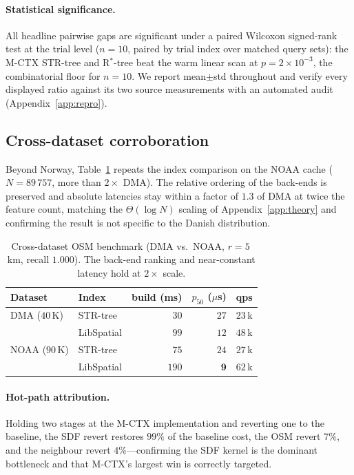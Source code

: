 \paragraph*{Statistical significance.}
All headline pairwise gaps are significant under a paired Wilcoxon
signed-rank test at the trial level ($n{=}10$, paired by trial index over
matched query sets): the M-CTX STR-tree and R$^{*}$-tree beat the warm
linear scan at $p\!=\!2\!\times\!10^{-3}$, the combinatorial floor for
$n{=}10$. We report mean$\pm$std throughout and verify every displayed
ratio against its two source measurements with an automated audit
(Appendix~\ref{app:repro}).


\subsection{Cross-dataset corroboration}\label{ssec:noaa}
Beyond Norway, Table~\ref{tab:cross-dataset} repeats the index comparison
on the NOAA cache ($N{=}89\,757$, more than $2\times$ DMA). The relative
ordering of the back-ends is preserved and absolute latencies stay within
a factor of $1.3$ of DMA at twice the feature count, matching the
$\Theta(\log N)$ scaling of Appendix~\ref{app:theory} and confirming the
result is not specific to the Danish distribution.

\begin{table}[t]
\centering
\caption{Cross-dataset OSM benchmark (DMA vs.\ NOAA, $r{=}5$\,km,
recall $1.000$). The back-end ranking and near-constant latency hold at
$2\times$ scale.}\label{tab:cross-dataset}
\small
\begin{tabular}{llrrr}
\toprule
Dataset & Index & build (ms) & $p_{50}$ ($\mu$s) & qps \\
\midrule
DMA  ($40$\,K) & STR-tree    & $30$ & $27$ & $23$\,k \\
               & LibSpatial  & $99$ & $12$ & $48$\,k \\
\midrule
NOAA ($90$\,K) & STR-tree    & $75$ & $24$ & $27$\,k \\
               & LibSpatial  & $190$ & $\mathbf{9}$ & $62$\,k \\
\bottomrule
\end{tabular}
\end{table}

\paragraph*{Hot-path attribution.}
Holding two stages at the M-CTX implementation and reverting one to the
baseline, the SDF revert restores $99\%$ of the baseline cost, the OSM
revert $7\%$, and the neighbour revert $4\%$---confirming the SDF kernel
is the dominant bottleneck and that M-CTX's largest win is correctly
targeted.

